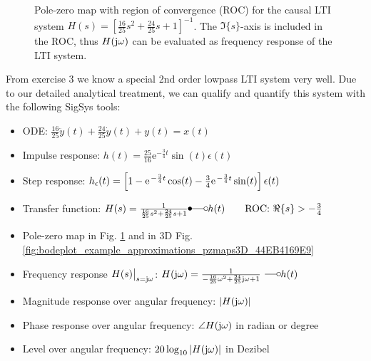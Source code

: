 \documentclass[11pt,a4paper,DIV=12]{scrartcl}
\numberwithin{equation}{section}
\numberwithin{figure}{section}
\newcommand{\fig}[1]{Fig. \ref{#1}} %
\begin{document}
\begin{figure}
\centering
{}
\caption{Pole-zero map with region of convergence (ROC) for the causal LTI system
$H(s) = \left[\frac{16}{25} s^2 + \frac{24}{25} s + 1\right]^{-1}$.
The $\Im\{s\}$-axis is included in the ROC, thus $H(\im\omega)$ can be evaluated as
frequency response of the LTI system.}
\label{fig:pzmap_44EB4169E9}
\end{figure}



From exercise 3 we know a special 2nd order lowpass LTI system very well.
Due to our detailed analytical treatment, we can qualify and quantify this system
with the following SigSys tools:
\begin{itemize}
  \item ODE: $\frac{16}{25} \ddot{y}(t) + \frac{24}{25} \dot{y}(t) + y(t) = x(t)$
  \item Impulse response: $h(t) = \frac{25}{16} \mathrm{e}^{-\frac{3}{4} t} \sin(t) \epsilon(t)$
  \item Step response: $h_\epsilon(t)=\left[1
  - \e^{-\frac{3}{4} t} \cos(t)
  - \frac{3}{4}\e^{-\frac{3}{4} t} \sin(t) \right]\epsilon(t)$
  \item Transfer function:
  $H(s) = \frac{1}{\frac{16}{25} s^2 + \frac{24}{25} s + 1}\Laplace h(t)
  \qquad\text{ROC: }\Re\{s\}>-\frac{3}{4}$
  \item Pole-zero map in \fig{fig:pzmap_44EB4169E9} and in 3D
  \fig{fig:bodeplot_example_approximations_pzmaps3D_44EB4169E9}
  \item Frequency response $H(s)\big|_{s=\im\omega}$:
  $H(\im\omega) = \frac{1}{-\frac{16}{25}\omega^2 + \frac{24}{25}\im\omega  + 1}
  \Fourier h(t)$
  \item Magnitude response over angular frequency: $|H(\im\omega)|$
  \item Phase response over angular frequency: $\angle H(\im\omega)$ in radian or degree
  \item Level over angular frequency: $20 \log_{10}|H(\im\omega)|$ in Dezibel
\end{itemize}
\end{document}
